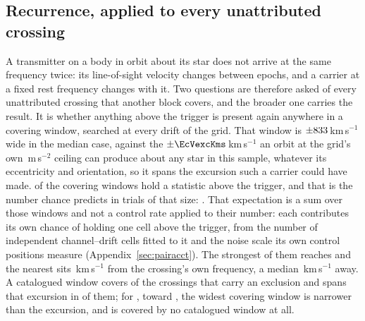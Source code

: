 \subsection{Recurrence, applied to every unattributed crossing}
\label{sec:etacrv}

A transmitter on a body in orbit about its star does not arrive at the same
frequency twice: its line-of-sight velocity changes between epochs, and a
carrier at a fixed rest frequency changes with it. Two questions are therefore
asked of every unattributed crossing that another block covers, and the
broader one carries the result. It is whether anything above the trigger is
present again anywhere in a covering window, searched at every drift of the
grid. That window is $\pm833$\,km\,s$^{-1}$ wide in the median case,
against the $\pm\EcVexcKms$\,km\,s$^{-1}$ an orbit at the grid's own
\WdAGrid\,m\,s$^{-2}$ ceiling can produce about any star in this sample,
whatever its eccentricity and orientation, so it spans the excursion such a
carrier could have made. \WdNExc{} of the \WdNCov{} covering windows hold a
statistic above the trigger, and that is the number chance predicts in trials
of that size: \WdExpect. That expectation is a sum over those windows and not
a control rate applied to their number: each contributes its own chance of
holding one cell above the trigger, from the number of independent
channel--drift cells fitted to it and the noise scale its own control
positions measure
(Appendix~\ref{sec:pairacct}). The strongest of them reaches \WdExcMax{} and the
nearest sits \WdNearKms\,km\,s$^{-1}$ from the crossing's own frequency, a
median \WdMedKms\,km\,s$^{-1}$ away. A catalogued window covers \WdNOrbTot{} of the
\RcNExcl{} crossings that carry an exclusion and spans that excursion in
\EcNSpan{} of them; for \EcNShort, toward \EcShortStarList, the widest
covering window is narrower than the excursion, and \WdNNoCov{} is covered by
no catalogued window at all.

